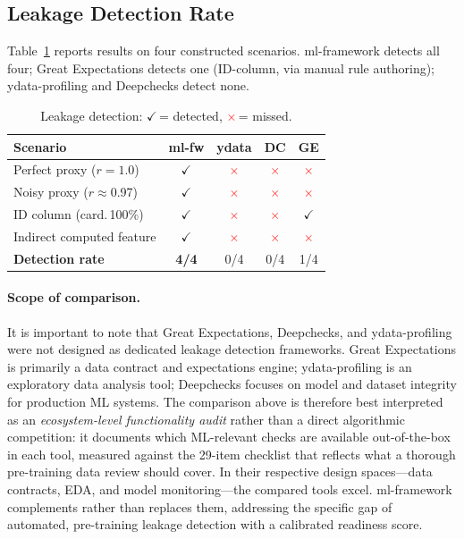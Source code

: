 \documentclass[11pt]{article}
\newcommand{\cmark}{\textbf{\textcolor{green!50!black}{$\checkmark$}}}
\newcommand{\xmark}{\textbf{\textcolor{red}{$\times$}}}
\begin{document}
\subsection{Leakage Detection Rate}

Table~\ref{tab:detection} reports results on four constructed scenarios.
ml-framework detects all four; Great Expectations detects one (ID-column, via
manual rule authoring); ydata-profiling and Deepchecks detect none.

\begin{table}[!h]
\centering
\caption{Leakage detection: \cmark\,= detected, \xmark\,= missed.}
\label{tab:detection}
\scriptsize
\begin{tabular}{lcccc}
\toprule
\textbf{Scenario} & \textbf{ml-fw} & \textbf{ydata} & \textbf{DC} & \textbf{GE} \\
\midrule
Perfect proxy ($r{=}1.0$)    & \cmark & \xmark & \xmark & \xmark \\
Noisy proxy ($r{\approx}$0.97) & \cmark & \xmark & \xmark & \xmark \\
ID column (card.\,100\%)      & \cmark & \xmark & \xmark & \cmark \\
Indirect computed feature     & \cmark & \xmark & \xmark & \xmark \\
\midrule
\textbf{Detection rate} & \textbf{4/4} & 0/4 & 0/4 & 1/4 \\
\bottomrule
\end{tabular}
\end{table}

\paragraph{Scope of comparison.}
It is important to note that Great Expectations, Deepchecks, and
ydata-profiling were not designed as dedicated leakage detection frameworks.
Great Expectations is primarily a data contract and expectations engine;
ydata-profiling is an exploratory data analysis tool; Deepchecks focuses on
model and dataset integrity for production ML systems.  The comparison above
is therefore best interpreted as an \emph{ecosystem-level functionality audit}
rather than a direct algorithmic competition: it documents which
ML-relevant checks are available out-of-the-box in each tool, measured
against the 29-item checklist that reflects what a thorough pre-training
data review should cover.  In their respective design spaces---data
contracts, EDA, and model monitoring---the compared tools excel.
ml-framework complements rather than replaces them, addressing the
specific gap of automated, pre-training leakage detection with a
calibrated readiness score.
\end{document}

